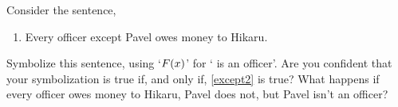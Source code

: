 
\problempart Consider the sentence,
\begin{enumerate}[start=19,ref=\arabic*]
	\item\label{except2} Every officer except Pavel owes money to Hikaru.
\end{enumerate}
Symbolize this sentence, using `$\mathord{F}(x)$' for ` is an officer'.  Are you confident that your symbolization is true if, and only if, \cref*{except2} is true?  What happens if every officer owes money to Hikaru, Pavel does not, but Pavel isn't an officer? 


